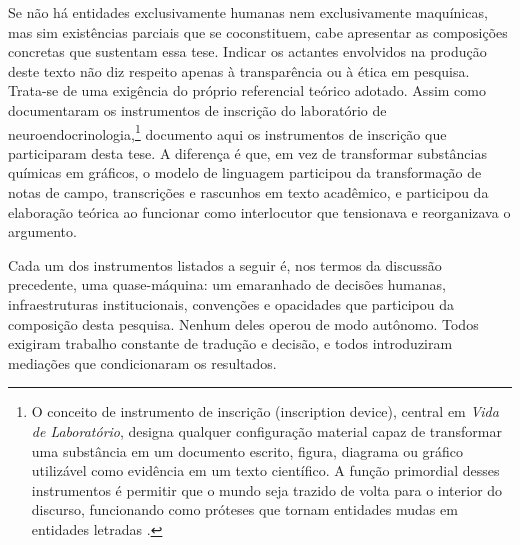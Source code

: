 Se não há entidades exclusivamente humanas nem exclusivamente maquínicas, mas sim existências parciais que se coconstituem, cabe apresentar as composições concretas que sustentam essa tese. Indicar os actantes envolvidos na produção deste texto não diz respeito apenas à transparência ou à ética em pesquisa. Trata-se de uma exigência do próprio referencial teórico adotado. Assim como \textcite{Latour1997VidaLaboratorio} documentaram os instrumentos de inscrição do laboratório de neuroendocrinologia,\footnote{O conceito de instrumento de inscrição (inscription device), central em \textit{Vida de Laboratório}, designa qualquer configuração material capaz de transformar uma substância em um documento escrito, figura, diagrama ou gráfico utilizável como evidência em um texto científico. A função primordial desses instrumentos é permitir que o mundo seja trazido de volta para o interior do discurso, funcionando como próteses que tornam entidades mudas em entidades letradas \parencite{Latour1990Drawing}.} documento aqui os instrumentos de inscrição que participaram desta tese. A diferença é que, em vez de transformar substâncias químicas em gráficos, o modelo de linguagem participou da transformação de notas de campo, transcrições e rascunhos em texto acadêmico, e participou da elaboração teórica ao funcionar como interlocutor que tensionava e reorganizava o argumento.

Cada um dos instrumentos listados a seguir é, nos termos da discussão precedente, uma quase-máquina: um emaranhado de decisões humanas, infraestruturas institucionais, convenções e opacidades que participou da composição desta pesquisa. Nenhum deles operou de modo autônomo. Todos exigiram trabalho constante de tradução e decisão, e todos introduziram mediações que condicionaram os resultados.

